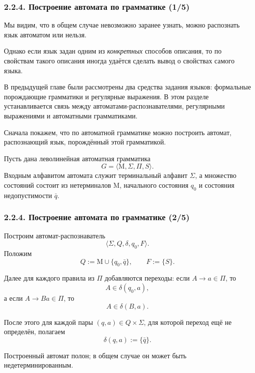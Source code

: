 \documentclass[mathserif,12pt,aspectratio=169]{beamer}
\def\emразделенной{\em разделенной}
\def\em#1{\it\color{blue}#1}
\def\Assign{\operatorname{:=}}
\begin{document}
\begin{frame}
\frametitle{2.2.4. Построение автомата по грамматике (1/5)}

Мы видим, что в общем случае невозможно заранее узнать,
можно распознать язык автоматом или нельзя.

\smallskip
Однако если язык задан одним из {\em конкретных} способов описания,
то по свойствам такого описания иногда удаётся сделать вывод
о свойствах самого языка.

\smallskip
В предыдущей главе были рассмотрены два средства задания языков:
формальные порождающие грамматики и регулярные выражения.
В этом разделе устанавливается связь между автоматами-распознавателями,
регулярными выражениями и автоматными грамматиками.

\smallskip
Сначала покажем, что по автоматной грамматике можно построить
автомат, распознающий язык, порождённый этой грамматикой.

\smallskip
Пусть дана леволинейная автоматная грамматика
\[
G=\langle \mathrm{M},\Sigma,\Pi,S\rangle.
\]
Входным алфавитом автомата служит терминальный алфавит \(\Sigma\),
а множество состояний состоит из нетерминалов \(\mathrm{M}\),
начального состояния \(q_0\) и состояния недопустимости \(\bar q\).

\end{frame}

\begin{frame}
\frametitle{2.2.4. Построение автомата по грамматике (2/5)}

Построим автомат-распознаватель
\[
\langle \Sigma,Q,\delta,q_0,F\rangle.
\]
Положим
\[
Q\Assign \mathrm{M}\cup\{q_0,\bar q\},
\qquad
F\Assign\{S\}.
\]

\smallskip
Далее для каждого правила из \(\Pi\) добавляются переходы:
если \(A\to a\in\Pi\), то
\[
A\in\delta(q_0,a),
\]
а если \(A\to Ba\in\Pi\), то
\[
A\in\delta(B,a).
\]

\smallskip
После этого для каждой пары \((q,a)\in Q\times\Sigma\),
для которой переход ещё не определён, полагаем
\[
\delta(q,a)\Assign\{\bar q\}.
\]

\smallskip
Построенный автомат полон; в общем случае он может быть
недетерминированным.

\end{frame}
\end{document}
